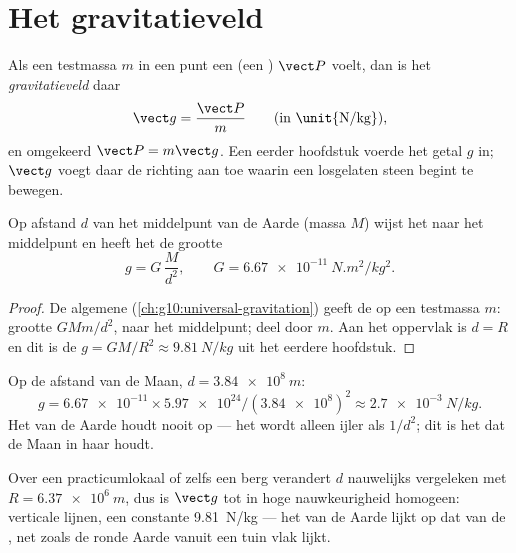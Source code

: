 \section{Het gravitatieveld}

\begin{definition}[Gravitatieveld]\label{def:g11:electric-gravitational-fields:gfield}
Als een testmassa $m$ in een punt een  (een )
$\vect P$ voelt, dan is het \emph{gravitatieveld}
daar
\[
\vect g = \frac{\vect P}{m} \qquad \text{(in \unit{N/kg})},
\]
en omgekeerd $\vect P = m \vect g$. Een eerder hoofdstuk voerde het getal
$g$ in; $\vect g$ voegt daar de richting aan toe waarin een losgelaten
steen begint te bewegen.
\end{definition}

\begin{proposition}\label{prop:g11:electric-gravitational-fields:earth}
Op afstand $d$ van het middelpunt van de Aarde (massa $M$) wijst het
 naar het middelpunt en heeft het de grootte
\[
g = G\,\frac{M}{d^2},
\qquad G = \qty{6.67e-11}{N.m^2/kg^2}.
\]
\end{proposition}

\begin{proof}
De algemene  (\cref{ch:g10:universal-gravitation}) geeft de
 op een testmassa $m$: grootte $G M m / d^2$, naar het middelpunt;
deel door $m$. Aan het oppervlak is $d = R$ en dit is de
$g = GM/R^2 \approx \qty{9.81}{N/kg}$ uit het eerdere hoofdstuk.
\end{proof}

\begin{example}\label{ex:g11:electric-gravitational-fields:moon}
Op de afstand van de Maan, $d = \qty{3.84e8}{m}$:
\[
g = \num{6.67e-11} \times \num{5.97e24} / (\num{3.84e8})^2
\approx \qty{2.7e-3}{N/kg}.
\]
Het  van de Aarde houdt nooit op --- het wordt alleen ijler als
$1/d^2$; dit is het  dat de Maan in haar  houdt.
\end{example}

\begin{remark}\label{rem:g11:electric-gravitational-fields:uniformg}
Over een practicumlokaal of zelfs een berg verandert $d$ nauwelijks
vergeleken met $R = \qty{6.37e6}{m}$, dus is $\vect g$ tot in hoge
nauwkeurigheid homogeen: verticale lijnen, een constante
\qty{9.81}{N/kg} --- het  van de Aarde lijkt op dat van de
, net zoals de ronde Aarde vanuit een tuin vlak lijkt.
\end{remark}

